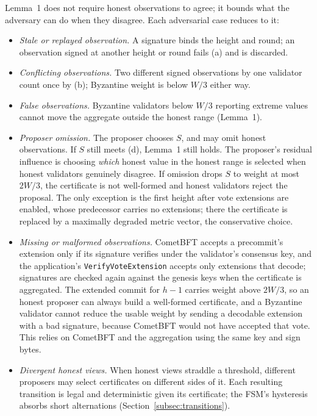 Lemma~1 does not require honest observations to agree; it bounds what the
adversary can do when they disagree. Each adversarial case reduces to it:
\begin{itemize}
  \item \emph{Stale or replayed observation.} A signature binds the height
  and round; an observation signed at another height or round fails (a) and
  is discarded.
  \item \emph{Conflicting observations.} Two different signed observations
  by one validator count once by (b); Byzantine weight is below $W/3$ either
  way.
  \item \emph{False observations.} Byzantine validators below $W/3$
  reporting extreme values cannot move the aggregate outside the honest range
  (Lemma~1).
  \item \emph{Proposer omission.} The proposer chooses $S$, and may omit
  honest observations. If $S$ still meets (d), Lemma~1 still holds. The
  proposer's residual influence is choosing \emph{which} honest value in the
  honest range is selected when honest validators genuinely disagree. If
  omission drops $S$ to weight at most $2W/3$, the certificate is not
  well-formed and honest validators reject the proposal. The only exception
  is the first height after vote extensions are enabled, whose predecessor
  carries no extensions; there the certificate is replaced by a maximally
  degraded metric vector, the conservative choice. 
  \item \emph{Missing or malformed observations.} CometBFT accepts a
  precommit's extension only if its signature verifies under the validator's
  consensus key, and the application's \texttt{VerifyVoteExtension} accepts
  only extensions that decode; signatures are checked again against the
  genesis keys when the certificate is aggregated. The extended commit for
  $h{-}1$ carries weight above $2W/3$, so an honest proposer can always build
  a well-formed certificate, and a Byzantine validator cannot reduce the
  usable weight by sending a decodable extension with a bad signature,
  because CometBFT would not have accepted that vote. This relies on CometBFT
  and the aggregation using the same key and sign bytes.
  \item \emph{Divergent honest views.} When honest views straddle a
  threshold, different proposers may select certificates on different sides
  of it. Each resulting transition is legal and deterministic given its
  certificate; the FSM's hysteresis absorbs short alternations
  (Section~\ref{subsec:transitions}).
\end{itemize}

